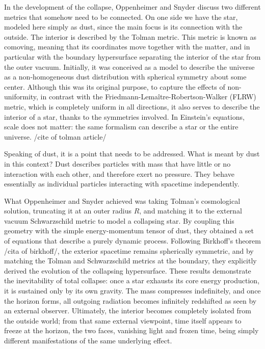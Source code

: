In the development of the collapse, Oppenheimer and Snyder discuss two different metrics that somehow need to be connected. On one side we have the star, modeled here simply as dust, since the main focus is its connection with the outside. The interior is described by the Tolman metric. This metric is known as comoving, meaning that its coordinates move together with the matter, and in particular with the boundary hypersurface separating the interior of the star from the outer vacuum. Initially, it was conceived as a model to describe the universe as a non-homogeneous dust distribution with spherical symmetry about some center. Although this was its original purpose, to capture the effects of non-uniformity, in contrast with the Friedmann-Lemaître-Robertson-Walker (FLRW) metric, which is completely uniform in all directions, it also serves to describe the interior of a star, thanks to the symmetries involved. In Einstein's equations, scale does not matter: the same formalism can describe a star or the entire universe. /cite of tolman article/

Speaking of dust, it is a point that needs to be addressed. What is meant by dust in this context? Dust describes particles with mass that have little or no interaction with each other, and therefore exert no pressure. They behave essentially as individual particles interacting with spacetime independently.

What Oppenheimer and Snyder achieved was taking Tolman's cosmological solution, truncating it at an outer radius $R$, and matching it to the external vacuum Schwarzschild metric to model a collapsing star. By coupling this geometry with the simple energy-momentum tensor of dust, they obtained a set of equations that describe a purely dynamic process. Following Birkhoff's theorem /cita of birkhoff/, the exterior spacetime remains spherically symmetric, and by matching the Tolman and Schwarzschild metrics at the boundary, they explicitly derived the evolution of the collapsing hypersurface. These results demonstrate the inevitability of total collapse: once a star exhausts its core energy production, it is sustained only by its own gravity. The mass compresses indefinitely, and once the horizon forms, all outgoing radiation becomes infinitely redshifted as seen by an external observer. Ultimately, the interior becomes completely isolated from the outside world; from that same external viewpoint, time itself appears to freeze at the horizon, the two faces, vanishing light and frozen time, being simply different manifestations of the same underlying effect.

